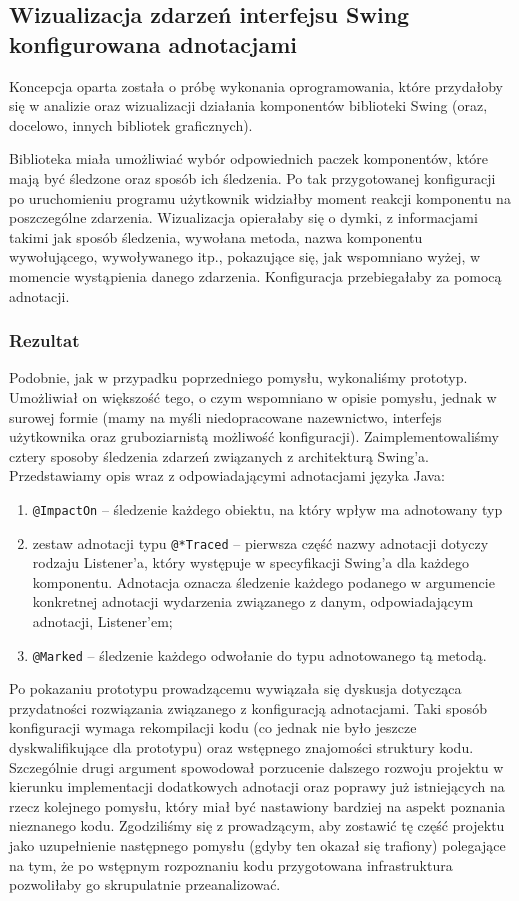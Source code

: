 \documentclass[12pt,a4paper,titlepage]{article}
\begin{document}
 \subsection{Wizualizacja zdarzeń interfejsu Swing konfigurowana adnotacjami}
 Koncepcja oparta została o próbę wykonania oprogramowania, które przydałoby się w analizie oraz wizualizacji działania komponentów biblioteki Swing (oraz, docelowo, innych bibliotek graficznych).
 
 Biblioteka miała umożliwiać wybór odpowiednich paczek komponentów, które mają być śledzone oraz sposób ich śledzenia. Po tak przygotowanej konfiguracji po uruchomieniu programu użytkownik widziałby moment reakcji komponentu na poszczególne zdarzenia. Wizualizacja opierałaby się o dymki, z informacjami takimi jak sposób śledzenia, wywołana metoda, nazwa komponentu wywołującego, wywoływanego itp., pokazujące się, jak wspomniano wyżej, w momencie wystąpienia danego zdarzenia. Konfiguracja przebiegałaby za pomocą adnotacji.
 
 \subsubsection*{Rezultat}
  Podobnie, jak w przypadku poprzedniego pomysłu, wykonaliśmy prototyp. Umożliwiał on większość tego, o czym wspomniano w opisie pomysłu, jednak w surowej formie (mamy na myśli niedopracowane nazewnictwo, interfejs użytkownika oraz gruboziarnistą możliwość konfiguracji). Zaimplementowaliśmy cztery sposoby śledzenia zdarzeń związanych z architekturą Swing'a. Przedstawiamy opis wraz z odpowiadającymi adnotacjami języka Java:
  \begin{enumerate}
   \item \texttt{@ImpactOn} -- śledzenie każdego obiektu, na który wpływ ma adnotowany typ 
   \item zestaw adnotacji typu \texttt{@*Traced} -- pierwsza część nazwy adnotacji dotyczy rodzaju Listener'a, który występuje w specyfikacji Swing'a dla każdego komponentu. Adnotacja oznacza śledzenie każdego podanego w argumencie konkretnej adnotacji wydarzenia związanego z danym, odpowiadającym adnotacji, Listener'em;
   \item \texttt{@Marked} -- śledzenie każdego odwołanie do typu adnotowanego tą metodą.
  \end{enumerate}
  
  Po pokazaniu prototypu prowadzącemu wywiązała się dyskusja dotycząca przydatności rozwiązania związanego z konfiguracją adnotacjami. Taki sposób konfiguracji wymaga rekompilacji kodu (co jednak nie było jeszcze dyskwalifikujące dla prototypu) oraz wstępnego znajomości struktury kodu. Szczególnie drugi argument spowodował porzucenie dalszego rozwoju projektu w kierunku implementacji dodatkowych adnotacji oraz poprawy już istniejących na rzecz kolejnego pomysłu, który miał być nastawiony bardziej na aspekt poznania nieznanego kodu. Zgodziliśmy się z prowadzącym, aby zostawić tę część projektu jako uzupełnienie następnego pomysłu (gdyby ten okazał się trafiony) polegające na tym, że po wstępnym rozpoznaniu kodu przygotowana infrastruktura pozwoliłaby go skrupulatnie przeanalizować.
  
\end{document}
